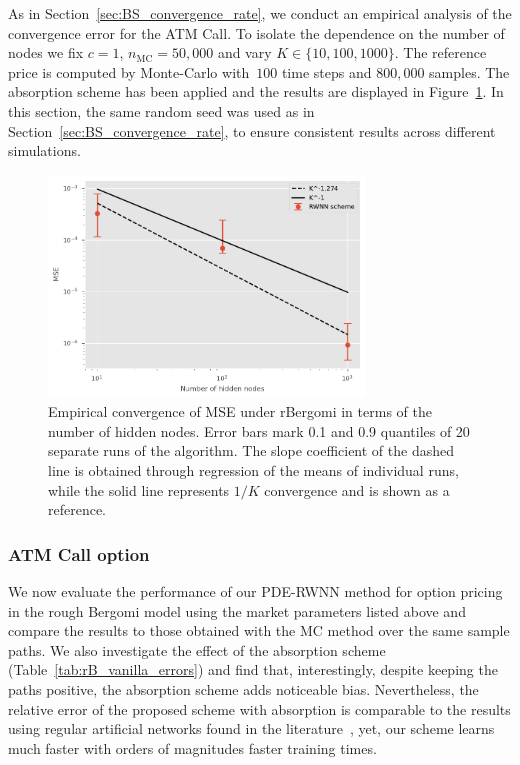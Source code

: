 As in Section~\ref{sec:BS_convergence_rate}, we conduct an empirical analysis of the convergence error for the ATM Call. 
To isolate the dependence on the number of nodes we fix $c=1$, $n_{\mathrm{MC}}=50,000$ and vary $K\in\{10, 100, 1000\}$. 
The reference price is computed by Monte-Carlo with~$100$ time steps and $800,000$ samples. 
The absorption scheme has been applied and the results are displayed in Figure~\ref{fig:rBconvergence}. 
In this section, the same random seed was used as in Section~\ref{sec:BS_convergence_rate}, to ensure consistent results across different simulations.

\begin{figure}[hbt!]
    \centering
    \includegraphics[width=0.75\textwidth]{content/reschap2/Figures/rBergomi_convergence_K_1e3.pdf}
    \caption{Empirical convergence of MSE under rBergomi in terms of  the number of hidden nodes. Error bars mark 0.1 and 0.9 quantiles of 20 separate runs of the algorithm. The slope coefficient of the dashed line is obtained through regression of the means of individual runs, while the solid line represents $1/K$ convergence and is shown as a reference.}
    \label{fig:rBconvergence}
\end{figure}

\subsubsection{ATM Call option}\label{sec:resutls_call_rB}

We now evaluate the performance of our PDE-RWNN method for option pricing in the rough Bergomi model using the market parameters listed above and compare the results to those obtained with the MC method over the same sample paths. We also investigate the effect of the absorption scheme (Table~\ref{tab:rB_vanilla_errors}) and find that, interestingly, despite keeping the paths positive, the absorption scheme adds noticeable bias. 
Nevertheless, the relative error of the proposed scheme with absorption 
is comparable to the results using regular artificial networks found in the literature~\cite[Table~1]{Bayer2022PricingSPDEs}, yet, our scheme learns much faster with orders of magnitudes faster training times.

